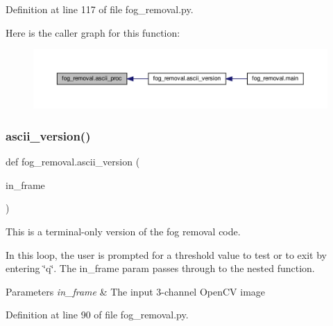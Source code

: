 Definition at line 117 of file fog\+\_\+removal.\+py.

Here is the caller graph for this function\+:\nopagebreak
\begin{figure}[H]
\begin{center}
\leavevmode
\includegraphics[width=350pt]{namespacefog__removal_a50fdb2a1e3f55a7f77230a689a372876_icgraph}
\end{center}
\end{figure}
\mbox{\label{namespacefog__removal_a6e25df53e59d9d8848b5e2ed5a399ea3}} 
\subsubsection{\texorpdfstring{ascii\+\_\+version()}{ascii\_version()}}
{\footnotesize\ttfamily def fog\+\_\+removal.\+ascii\+\_\+version (\begin{DoxyParamCaption}\item[{}]{in\+\_\+frame }\end{DoxyParamCaption})}



This is a terminal-\/only version of the fog removal code. 

In this loop, the user is prompted for a threshold value to test or to exit by entering \char`\"{}q\char`\"{}. The in\+\_\+frame param passes through to the nested function.


\begin{DoxyParams}{Parameters}
{\em in\+\_\+frame} & The input 3-\/channel Open\+CV image \\
\hline
\end{DoxyParams}


Definition at line 90 of file fog\+\_\+removal.\+py.

